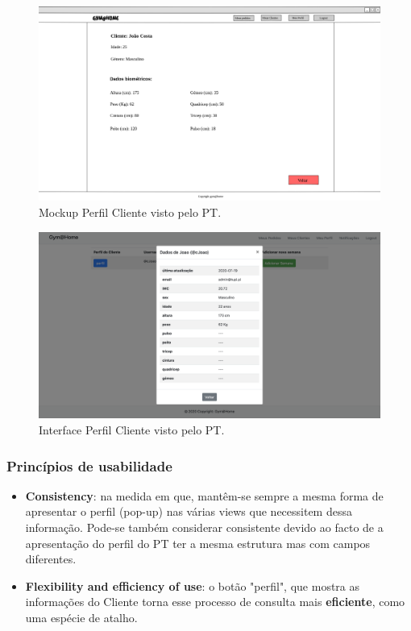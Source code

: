 \begin{figure}[H]
    \centering
    \includegraphics[scale=0.25]{images/mockups/pt_dados_cliente.png}
    \caption{Mockup Perfil Cliente visto pelo PT.}
    \label{fig:mockupperfilclientebypt}
\end{figure}

\begin{figure}[H]
    \centering
    \includegraphics[scale=0.25]{images/interfaces/pt_perfil_cliente.png}
    \caption{Interface Perfil Cliente visto pelo PT.}
    \label{fig:interfaceperfilclientebypt}
\end{figure}

\subsubsection{Princípios de usabilidade}
\begin{itemize}
    \item \textbf{Consistency}: na medida em que, mantêm-se sempre a mesma forma de apresentar o perfil (pop-up) nas várias views que necessitem dessa informação. Pode-se também considerar consistente devido ao facto de a apresentação do perfil do PT ter a mesma estrutura mas com campos diferentes.
    
    \item \textbf{Flexibility and efficiency of use}: o botão "perfil", que mostra as informações do Cliente torna esse processo de consulta mais \textbf{eficiente}, como uma espécie de atalho.
\end{itemize}

